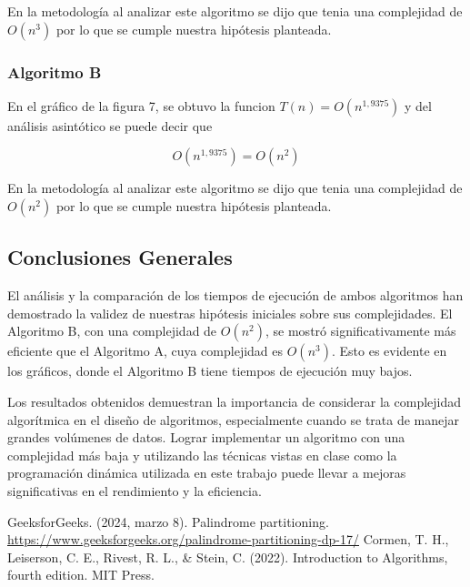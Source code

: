 \documentclass[12pt]{article}
\begin{document}
En la metodología al analizar este algoritmo se dijo que tenia una complejidad de $O(n^3)$ por lo que se cumple nuestra hipótesis planteada.

\subsubsection{Algoritmo B}
En el gráfico de la figura 7, se obtuvo la funcion $T(n) = O(n^{1,9375})$ y del análisis asintótico se puede decir que

$$O(n^{1,9375}) = O(n^2)$$

En la metodología al analizar este algoritmo se dijo que tenia una complejidad de $O(n^2)$ por lo que se cumple nuestra hipótesis planteada.

\subsection{Conclusiones Generales}

El análisis y la comparación de los tiempos de ejecución de ambos algoritmos han demostrado la validez de nuestras hipótesis iniciales sobre sus complejidades. El Algoritmo B, con una complejidad de $O(n^2)$, se mostró significativamente más eficiente que el Algoritmo A, cuya complejidad es $O(n^3)$. Esto es evidente en los gráficos, donde el Algoritmo B tiene tiempos de ejecución muy bajos.

Los resultados obtenidos demuestran la importancia de considerar la complejidad algorítmica en el diseño de algoritmos, especialmente cuando se trata de manejar grandes volúmenes de datos. Lograr implementar un algoritmo con una complejidad más baja y utilizando las técnicas vistas en clase como la programación dinámica utilizada en este trabajo puede llevar a mejoras significativas en el rendimiento y la eficiencia.


\begin{thebibliography}{}

GeeksforGeeks. (2024, marzo 8). Palindrome partitioning. \url{https://www.geeksforgeeks.org/palindrome-partitioning-dp-17/}
Cormen, T. H., Leiserson, C. E., Rivest, R. L., \& Stein, C. (2022). Introduction to Algorithms, fourth edition. MIT Press.

\end{thebibliography}
\end{document}
